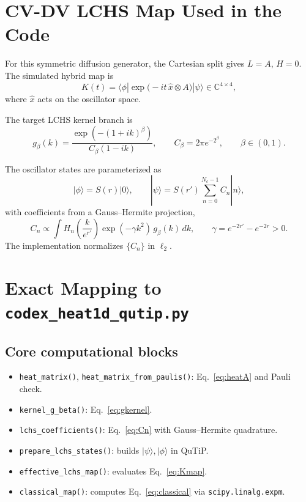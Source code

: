 \documentclass[11pt]{article}
\begin{document}
\section{CV-DV LCHS Map Used in the Code}
For this symmetric diffusion generator, the Cartesian split gives $L=A$, $H=0$.
The simulated hybrid map is
\begin{equation}
K(t)=\langle\phi|\exp\bigl(-it\,\hat{x}\otimes A\bigr)|\psi\rangle
\in \mathbb{C}^{4\times4},
\label{eq:Kmap}
\end{equation}
where $\hat{x}$ acts on the oscillator space.

The target LCHS kernel branch is
\begin{equation}
g_\beta(k)=\frac{\exp\!\left(-(1+ik)^\beta\right)}{C_\beta(1-ik)},
\qquad C_\beta=2\pi e^{-2^\beta},
\qquad \beta\in(0,1).
\label{eq:gkernel}
\end{equation}

The oscillator states are parameterized as
\begin{equation}
|\phi\rangle=S(r)|0\rangle,
\qquad
|\psi\rangle=S(r')\sum_{n=0}^{N_c-1}C_n|n\rangle,
\end{equation}
with coefficients from a Gauss--Hermite projection,
\begin{equation}
C_n\propto\int
H_n\!\left(\frac{k}{e^{r'}}\right)
\exp(-\gamma k^2)
\,g_\beta(k)\,dk,
\qquad
\gamma=e^{-2r'}-e^{-2r}>0.
\label{eq:Cn}
\end{equation}
The implementation normalizes $\{C_n\}$ in $\ell_2$.

\section{Exact Mapping to \texttt{codex\_heat1d\_qutip.py}}
\subsection{Core computational blocks}
\begin{itemize}[itemsep=2pt]
  \item \texttt{heat\_matrix()}, \texttt{heat\_matrix\_from\_paulis()}: Eq.~\eqref{eq:heatA} and Pauli check.
  \item \texttt{kernel\_g\_beta()}: Eq.~\eqref{eq:gkernel}.
  \item \texttt{lchs\_coefficients()}: Eq.~\eqref{eq:Cn} with Gauss--Hermite quadrature.
  \item \texttt{prepare\_lchs\_states()}: builds $|\psi\rangle,|\phi\rangle$ in QuTiP.
  \item \texttt{effective\_lchs\_map()}: evaluates Eq.~\eqref{eq:Kmap}.
  \item \texttt{classical\_map()}: computes Eq.~\eqref{eq:classical} via \texttt{scipy.linalg.expm}.
\end{itemize}
\end{document}
